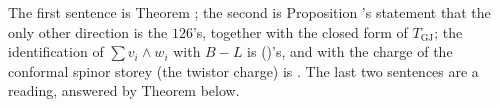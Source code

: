 The first sentence is Theorem ; the second is Proposition 's statement that the only other direction is the $126$'s, together with the closed form of $T_{\mathrm{GJ}}$; the identification of $\sum v_{i}\wedge w_{i}$ with $B - L$ is \cite[Prop.~8.1]{ButlerT13} ()'s, and with the charge of the conformal spinor storey (the twistor charge) is \cite[\S 3]{ButlerT9}. The last two sentences are a reading, answered by Theorem  below.
